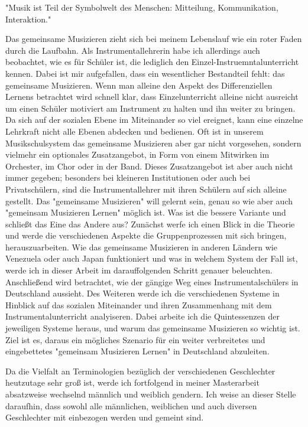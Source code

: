 
"Musik ist Teil der Symbolwelt des Menschen: Mitteilung, Kommunikation,
Interaktion." \autocite[91]{doerne:umfassend_musizieren}

Das gemeinsame Musizieren zieht sich bei meinem Lebenslauf wie ein roter Faden
durch die Laufbahn. Als Instrumentallehrerin habe ich allerdings auch
beobachtet, wie es für Schüler ist, die lediglich den
Einzel-Instruemntalunterricht kennen. Dabei ist mir aufgefallen, dass ein
wesentlicher Bestandteil fehlt: das
gemeinsame Musizieren. Wenn man alleine den Aspekt des
Differenziellen Lernens betrachtet wird schnell klar, dass Einzelunterricht
alleine nicht ausreicht um einen Schüler motiviert am Instrument zu halten und
ihn weiter zu bringen. Da sich auf der sozialen Ebene im Miteinander so viel
ereignet, kann eine einzelne Lehrkraft nicht alle Ebenen abdecken und bedienen.
Oft ist in unserem Musikschulsystem das gemeinsame Musizieren aber gar nicht
vorgesehen, sondern vielmehr ein optionales Zusatzangebot, in Form von einem
Mitwirken im Orchester, im Chor
oder in der Band. Dieses Zusatzangebot ist aber auch nicht immer gegeben;
besonders bei kleineren Institutionen oder auch bei Privatschülern, sind die
Instrumentallehrer mit ihren Schülern auf sich alleine gestellt. 
Das "gemeinsame Musizieren" will gelernt sein, genau so wie 
aber auch "gemeinsam Musizieren Lernen" möglich ist. Was ist die bessere
Variante und schließt das Eine das Andere aus? Zunächst werfe ich einen Blick in
die Theorie und werde die verschiedenen Aspekte die Gruppenprozessen mit sich
bringen, herauszuarbeiten.
Wie das gemeinsame Musizieren in anderen Ländern wie
Venezuela oder auch Japan funktioniert und was in welchem System der Fall ist,
werde ich in dieser Arbeit im darauffolgenden Schritt
genauer beleuchten. Anschließend wird betrachtet, wie der gängige Weg eines
Instrumentalschülers in Deutschland aussieht. Des Weiteren werde ich die verschiedenen
Systeme in Hinblick auf das sozialen Miteinander und ihren Zusammenhang mit
dem Instrumentalunterricht analyiseren. Dabei arbeite ich die Quintessenzen der
jeweiligen Systeme heraus, und warum das gemeinsame Musizieren so
wichtig ist. Ziel ist es, daraus ein mögliches Szenario für ein weiter
verbreitetes und eingebettetes 
"gemeinsam Musizieren Lernen" in Deutschland abzuleiten.


Da die Vielfalt an Terminologien bezüglich der verschiedenen
Geschlechter heutzutage sehr groß ist, werde ich fortfolgend in meiner Masterarbeit
absatzweise wechselnd männlich und weiblich gendern. Ich weise an dieser Stelle
daraufhin, dass sowohl alle männlichen, weiblichen und auch diversen
Geschlechter mit einbezogen werden und gemeint sind. 
